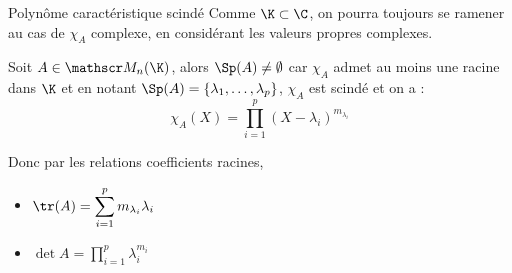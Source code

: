 \begin{proposition}{Polynôme caractéristique scindé}{}
    Comme $\K \subset \C$, on pourra toujours se ramener au cas de $\chi_A$ complexe, en 
    considérant les valeurs propres complexes.

    Soit $A \in \mathscr M_n(\K)$, alors $\Sp(A) \neq \emptyset$ car $\chi_A$ admet au moins une racine dans $\K$
    et en notant $\Sp(A) = \{\lambda_1, \ldots, \lambda_p \}$, $\chi_A$ est scindé et on a :
    $$\chi_A(X) = \prod_{i = 1 }^{ p } (X - \lambda_i)^{m_{\lambda_i}}$$

    Donc par les relations coefficients racines, 
    \begin{itemize}
        \item $\displaystyle \tr(A) = \sum_{i = 1 }^{ p } m_{\lambda_i} \lambda_i$ 
        \item $\displaystyle \det A = \prod_{i = 1 }^{ p } \lambda_i^{m_{i}}$
    \end{itemize}
\end{proposition}

